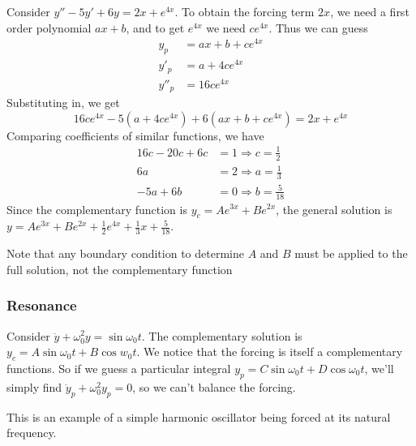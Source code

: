 \documentclass[a4paper]{article}
\begin{document}
\begin{eg}
  Consider $y'' - 5y' + 6y = 2x + e^{4x}$. To obtain the forcing term $2x$, we need a first order polynomial $ax + b$, and to get $e^{4x}$ we need $ce^{4x}$. Thus we can guess
  \begin{align*}
    y_p &= ax + b + ce^{4x}\\
    y'_p &= a + 4ce^{4x}\\
    y''_p &= 16ce^{4x}
  \end{align*}
  Substituting in, we get
  \[
    16ce^{4x} - 5(a + 4ce^{4x}) + 6(ax + b + ce^{4x}) = 2x + e^{4x}
  \]
  Comparing coefficients of similar functions, we have
  \begin{align*}
    16c - 20c + 6c &= 1\Rightarrow c = \frac{1}{2}\\
    6a &= 2 \Rightarrow a = \frac{1}{3}\\
    -5a + 6b &= 0 \Rightarrow b = \frac{5}{18}
  \end{align*}
  Since the complementary function is $y_c = Ae^{3x} + Be^{2x}$, the general solution is $y = Ae^{3x} + Be^{2x} + \frac{1}{2}e^{4x} + \frac{1}{3}x + \frac{5}{18}$.

  Note that any boundary condition to determine $A$ and $B$ must be applied to the full solution, not the complementary function
\end{eg}
\subsubsection{Resonance}
Consider $\ddot y + \omega_0^2 y = \sin \omega_0 t$. The complementary solution is $y_c = A\sin \omega_0 t + B\cos w_0 t$. We notice that the forcing is itself a complementary functions. So if we guess a particular integral $y_p = C\sin \omega_0 t + D\cos \omega_0 t$, we'll simply find $\ddot y_p + \omega_0 ^2 y_p = 0$, so we can't balance the forcing.

This is an example of a simple harmonic oscillator being forced at its natural frequency.
\end{document}
